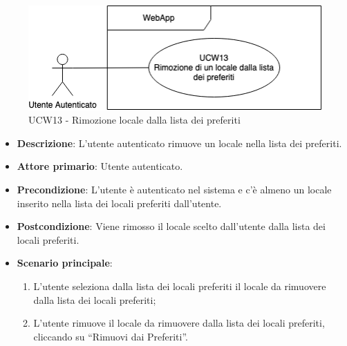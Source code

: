 \begin{figure}[!h]
\centering
    \includegraphics[scale=0.5]{UC_images/UCW13.png} 
    \caption{UCW13 - Rimozione locale dalla lista dei preferiti}
\end{figure}
\begin{itemize}
	\item \textbf{Descrizione}: L'utente autenticato rimuove un locale nella lista dei preferiti.
    \item \textbf{Attore primario}: Utente autenticato.
    \item \textbf{Precondizione}:  L’utente è autenticato nel sistema e c'è almeno un locale inserito nella lista dei locali preferiti dall’utente.
    \item \textbf{Postcondizione}: Viene rimosso il locale scelto dall’utente dalla lista dei locali preferiti.
    \item \textbf{Scenario principale}:
    \begin{enumerate}
        \item L’utente seleziona dalla lista dei locali preferiti il locale da rimuovere dalla lista dei locali preferiti;
        \item L’utente rimuove il locale da rimuovere dalla lista dei locali preferiti, cliccando su “Rimuovi dai Preferiti”.
    \end{enumerate}
\end{itemize}
